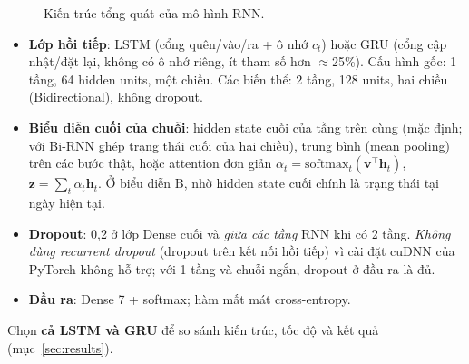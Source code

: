 \begin{figure}[H]\centering
{}
\caption{Kiến trúc tổng quát của mô hình RNN.}\label{fig:rnn}
\end{figure}

\begin{itemize}
\item \textbf{Lớp hồi tiếp}: LSTM (cổng quên/vào/ra + ô nhớ $c_t$) hoặc GRU (cổng cập nhật/đặt lại, không có ô nhớ riêng, ít
  tham số hơn $\approx$25\%). Cấu hình gốc: 1 tầng, 64 hidden units, một chiều. Các biến thể: 2 tầng, 128 units, hai chiều
  (Bidirectional), không dropout.
\item \textbf{Biểu diễn cuối của chuỗi}: hidden state cuối của tầng trên cùng (mặc định; với Bi-RNN ghép trạng thái cuối của hai
  chiều), trung bình (mean pooling) trên các bước thật, hoặc attention đơn giản $\alpha_t=\mathrm{softmax}_t(\mathbf{v}^\top
  \mathbf{h}_t)$, $\mathbf{z}=\sum_t\alpha_t\mathbf{h}_t$. Ở biểu diễn B, nhờ  hidden state cuối chính là
  trạng thái tại ngày hiện tại.
\item \textbf{Dropout}: 0,2 ở lớp Dense cuối và \emph{giữa các tầng} RNN khi có 2 tầng. \emph{Không dùng recurrent dropout}
  (dropout trên kết nối hồi tiếp) vì cài đặt cuDNN của PyTorch không hỗ trợ; với 1 tầng và chuỗi ngắn, dropout ở đầu ra là đủ.
\item \textbf{Đầu ra}: Dense 7 + softmax; hàm mất mát cross-entropy.
\end{itemize}
Chọn \textbf{cả LSTM và GRU} để so sánh kiến trúc, tốc độ và kết quả (mục~\ref{sec:results}).

